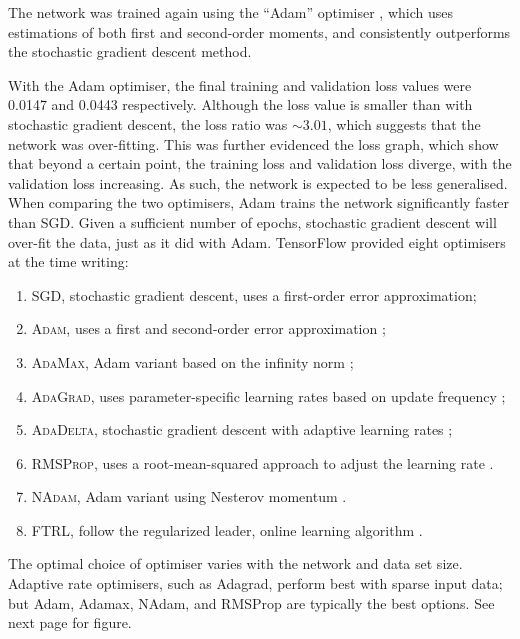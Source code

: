 The network was trained again using the ``Adam'' optimiser
\citep{Kingma:2014:Adam}, which uses estimations of both first and second-order
moments, and consistently outperforms the stochastic gradient descent method.

With the Adam optimiser, the final training and validation loss values were
0.0147 and 0.0443 respectively.
Although the loss value is smaller than with stochastic gradient descent, the
loss ratio was $\sim3.01$, which suggests that the network was over-fitting.
This was further evidenced the loss graph, which show that beyond a certain
point, the training loss and validation loss diverge, with the validation loss
increasing.
As such, the network is expected to be less generalised.
When comparing the two optimisers, Adam trains the network significantly faster
than SGD.
Given a sufficient number of epochs, stochastic gradient descent will over-fit
the data, just as it did with Adam.
\newpage\noindent
TensorFlow provided eight optimisers at the time writing:
\begin{enumerate}

    \item\textsc{SGD}, stochastic gradient descent, uses a first-order error
        approximation;

    \item\textsc{Adam}, uses a first and second-order error approximation
        \citep{Kingma:2014:Adam};

    \item\textsc{AdaMax}, Adam variant based on the infinity norm
        \citep{Kingma:2014:Adam};

    \item\textsc{AdaGrad}, uses parameter-specific learning rates based on
        update frequency \citep{Duchi:2011:Adagrad};

    \item\textsc{AdaDelta}, stochastic gradient descent with adaptive learning
        rates \citep{Zeiler:2012:Adadelta};

    \item\textsc{RMSProp}, uses a root-mean-squared approach to adjust the
        learning rate \citep{Hinton:2014:RMSProp}.

    \item\textsc{NAdam}, Adam variant using Nesterov momentum
        \citep{Dozat:2016:NAdam}.

    \item\textsc{FTRL}, follow the regularized leader, online learning
        algorithm \citep{McMahan:2013:FTRL}.

\end{enumerate}
The optimal choice of optimiser varies with the network and data set size.
Adaptive rate optimisers, such as Adagrad, perform best with sparse input data;
but Adam, Adamax, NAdam, and RMSProp are typically the best options.
See next page for figure.


